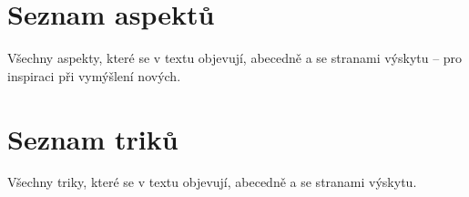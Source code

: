 \documentclass[../main.tex]{subfiles}
\begin{document}

\section{Seznam aspektů}
\label{sec:seznam-aspektu}

Všechny aspekty, které se v textu objevují, abecedně a se stranami výskytu -- pro inspiraci při vymýšlení nových.


\section{Seznam triků}
\label{sec:seznam-triku}

Všechny triky, které se v textu objevují, abecedně a se stranami výskytu.

\end{document}
